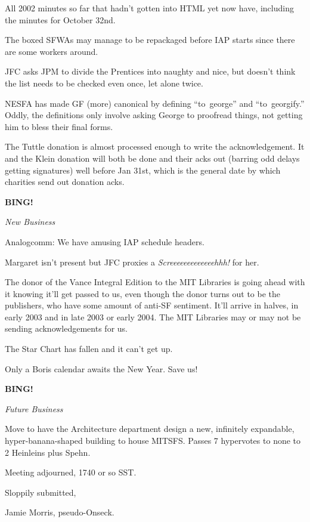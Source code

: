 \documentclass[12pt]{article}
\newcommand{\bing}{{\bf BING!} }
\newcommand{\goto}[1]{\bing \vskip 12pt \centerline{{\em{#1}}}}
\begin{document}
All 2002 minutes so far that hadn't gotten into HTML yet now have,
including the minutes for October 32nd.

The boxed SFWAs may manage to be repackaged before IAP starts since there
are some workers around.

JFC asks JPM to divide the Prentices into naughty and nice, but doesn't
think the list needs to be checked even once, let alone twice.

NESFA has made GF (more) canonical by defining ``to~george'' and 
``to~georgify.''  Oddly, the definitions only involve asking George to
proofread things, not getting him to bless their final forms.

The Tuttle donation is almost processed enough to write the acknowledgement.
It and the Klein donation will both be done and their acks out (barring odd
delays getting signatures) well before Jan 31st, which is the general date
by which charities send out donation acks.

\goto{New Business}

Analogcomm: We have amusing IAP schedule headers.

Margaret isn't present but JFC proxies a \emph{Screeeeeeeeeeeeehhh!} for her.

The donor of the Vance Integral Edition to the MIT Libraries is going ahead
with it knowing it'll get passed to us, even though the donor turns out to
be the publishers, who have some amount of anti-SF sentiment.  It'll arrive
in halves, in early 2003 and in late 2003 or early 2004.  The MIT Libraries
may or may not be sending acknowledgements for us.

The Star Chart has fallen and it can't get up.

Only a Boris calendar awaits the New Year.  Save us!

\goto{Future Business}

Move to have the Architecture department design a new, infinitely
expandable, hyper-banana-shaped building to house MITSFS.
Passes 7 hypervotes to none to 2 Heinleins plus Spehn.

\vspace{12pt}

\noindent
Meeting adjourned, 1740 or so SST.

\vspace{18pt}

\centerline{Sloppily submitted,}
\centerline{Jamie Morris, pseudo-Onseck.}
\end{document}
